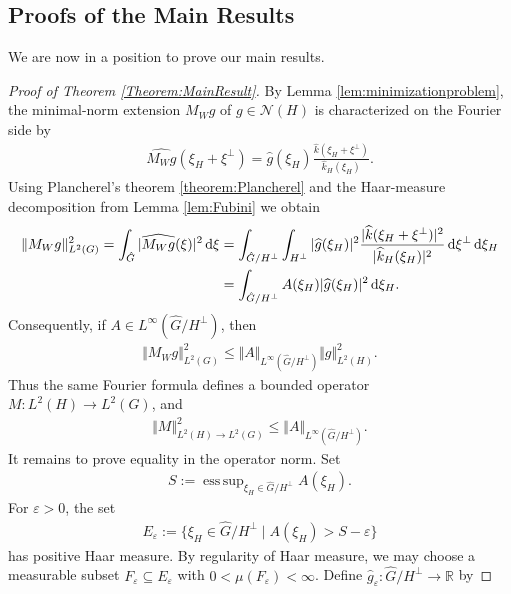 \documentclass{article}
\renewcommand{\d}{\, \textup{d}}
\newcommand{\R}{\mathbb{R}}
\DeclareMathOperator*{\esssup}{ess\,sup}
\begin{document}
\begin{appendices}
\section{Proofs of the Main Results}\label{sec:proofs}\label{sec:5}
We are now in a position to prove our main results.

\begin{proof}[Proof of Theorem \ref{Theorem:MainResult}]
    By Lemma \ref{lem:minimizationproblem}, the minimal-norm extension $M_Wg$ of $g\in\mathcal N(H)$ is characterized on the Fourier side by 
    \begin{align*}
        \widehat{M_W g}(\xi_H+\xi^\perp)
=
\hat g(\xi_H)
\frac{\hat k(\xi_H+\xi^\perp)}
{\hat k_H(\xi_H)}.
    \end{align*}
Using Plancherel's theorem \ref{theorem:Plancherel} and the Haar-measure decomposition from Lemma \ref{lem:Fubini} we obtain 
\begin{align*}
    \Vert M_Wg\Vert_{L^2(G)}^2
=\int_{\hat G} |\widehat{M_Wg}(\xi)|^2 \d\xi 
&=\int_{\hat G/H^\perp} \int_{H^\perp}|\widehat g(\xi_H)|^2\frac{|\widehat k(\xi_H+\xi^\perp)|^2
}{|\widehat k_H(\xi_H)|^2}\d\xi^\perp \d\xi_H \\
&=\int_{\hat G/H^\perp} A(\xi_H)|\widehat g(\xi_H)|^2 \d\xi_H .
\end{align*}
Consequently, if $A\in L^\infty(\widehat G/H^\perp)$, then 
\begin{align*}
    \Vert M_Wg \Vert_{L^2(G)}^2 \leq \Vert A\Vert_{L^\infty(\hat G/H^\perp)}
\Vert g \Vert_{L^2(H)}^2 .
\end{align*} 
Thus the same Fourier formula defines a bounded operator $M:L^2(H)\to L^2(G)$, and 
\begin{align*}
    \Vert M \Vert_{L^2(H)\to L^2(G)}^2 \leq \Vert A\Vert_{L^\infty(\hat G/H^\perp)}.
\end{align*}
It remains to prove equality in the operator norm. Set
\begin{align*}
    S:=
\esssup_{\xi_H\in\hat G/H^\perp}
A(\xi_H).
\end{align*}
For $\varepsilon>0$, the set 
\begin{align*}
    E_\varepsilon
:=
\{\xi_H\in\widehat G/H^\perp\mid A(\xi_H)>S-\varepsilon\}
\end{align*}
has positive Haar measure. By regularity of Haar measure, we may choose a measurable subset $F_\varepsilon \subseteq E_\varepsilon$ with 
$0<\mu(F_\varepsilon)<\infty$. 
Define $\hat{g}_{\varepsilon}:\hat{G}/H^\perp \to \R$ by  

\end{proof}
\end{appendices}
\end{document}
